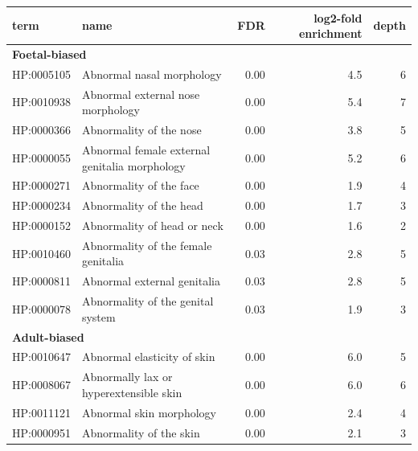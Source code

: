 \documentclass[
]{article}
\begin{document}
\begin{table}
{\begin{tabular}[t]{l|l|r|r|r}
\hline
term & name & FDR & log2-fold enrichment & depth\\
\hline
\multicolumn{5}{l}{\textbf{Foetal-biased}}\\
\hline
\hspace{1em}HP:0005105 & Abnormal nasal morphology & 0.00 & 4.5 & 6\\
\hline
\hspace{1em}HP:0010938 & Abnormal external nose morphology & 0.00 & 5.4 & 7\\
\hline
\hspace{1em}HP:0000366 & Abnormality of the nose & 0.00 & 3.8 & 5\\
\hline
\hspace{1em}HP:0000055 & Abnormal female external genitalia morphology & 0.00 & 5.2 & 6\\
\hline
\hspace{1em}HP:0000271 & Abnormality of the face & 0.00 & 1.9 & 4\\
\hline
\hspace{1em}HP:0000234 & Abnormality of the head & 0.00 & 1.7 & 3\\
\hline
\hspace{1em}HP:0000152 & Abnormality of head or neck & 0.00 & 1.6 & 2\\
\hline
\hspace{1em}HP:0010460 & Abnormality of the female genitalia & 0.03 & 2.8 & 5\\
\hline
\hspace{1em}HP:0000811 & Abnormal external genitalia & 0.03 & 2.8 & 5\\
\hline
\hspace{1em}HP:0000078 & Abnormality of the genital system & 0.03 & 1.9 & 3\\
\hline
\multicolumn{5}{l}{\textbf{Adult-biased}}\\
\hline
\hspace{1em}HP:0010647 & Abnormal elasticity of skin & 0.00 & 6.0 & 5\\
\hline
\hspace{1em}HP:0008067 & Abnormally lax or hyperextensible skin & 0.00 & 6.0 & 6\\
\hline
\hspace{1em}HP:0011121 & Abnormal skin morphology & 0.00 & 2.4 & 4\\
\hline
\hspace{1em}HP:0000951 & Abnormality of the skin & 0.00 & 2.1 & 3\\

\end{tabular}}
\end{table}
\end{document}
